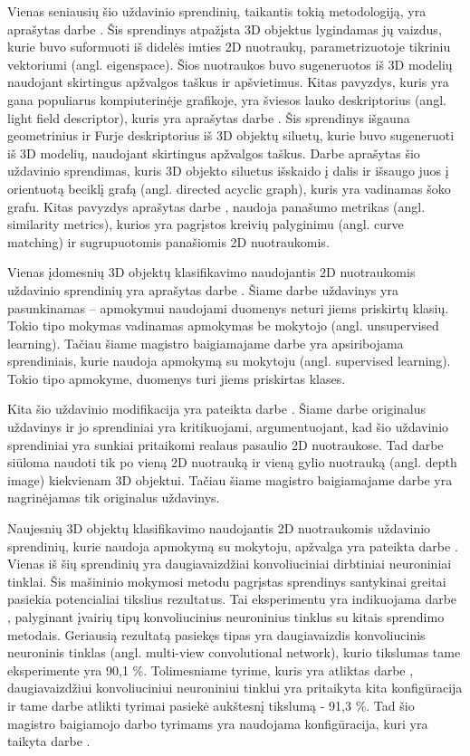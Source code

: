 Vienas seniausių šio uždavinio sprendinių, taikantis tokią metodologiją, yra aprašytas darbe \cite{prevWparEig}. Šis sprendinys atpažįsta 3D objektus lygindamas jų vaizdus, kurie buvo suformuoti iš didelės imties 2D nuotraukų, parametrizuotoje tikriniu vektoriumi (angl. eigenspace). Šios nuotraukos buvo sugeneruotos iš 3D modelių naudojant skirtingus apžvalgos taškus ir apšvietimus. Kitas pavyzdys, kuris yra gana populiarus kompiuterinėje grafikoje, yra šviesos lauko deskriptorius (angl. light field descriptor), kuris yra aprašytas darbe \cite{prevWLightFld}. Šis sprendinys išgauna geometrinius ir Furje deskriptorius iš 3D objektų siluetų, kurie buvo sugeneruoti iš 3D modelių, naudojant skirtingus apžvalgos taškus. Darbe \cite{prevWShockGraph} aprašytas šio uždavinio sprendimas, kuris 3D objekto siluetus išskaido į dalis ir išsaugo juos į orientuotą beciklį grafą (angl. directed acyclic graph), kuris yra vadinamas šoko grafu. Kitas pavyzdys aprašytas darbe \cite{prevWSimMet}, naudoja panašumo metrikas (angl. similarity metrics), kurios yra pagrįstos kreivių palyginimu (angl. curve matching) ir sugrupuotomis panašiomis 2D nuotraukomis.

Vienas įdomesnių 3D objektų klasifikavimo naudojantis 2D nuotraukomis uždavinio sprendinių yra aprašytas darbe \cite{self_supervised}. Šiame darbe uždavinys yra pasunkinamas -- apmokymui naudojami duomenys neturi jiems priskirtų klasių. Tokio tipo mokymas vadinamas apmokymas be mokytojo (angl. unsupervised learning). Tačiau šiame magistro baigiamajame darbe yra apsiribojama sprendiniais, kurie naudoja apmokymą su mokytoju (angl. supervised learning). Tokio tipo apmokyme, duomenys turi jiems priskirtas klases.

Kita šio uždavinio modifikacija yra pateikta darbe \cite{depth_images}. Šiame darbe originalus uždavinys ir jo sprendiniai yra kritikuojami, argumentuojant, kad šio uždavinio sprendiniai yra sunkiai pritaikomi realaus pasaulio 2D nuotraukose. Tad darbe \cite{depth_images} siūloma naudoti tik po vieną 2D nuotrauką ir vieną gylio nuotrauką (angl. depth image) kiekvienam 3D objektui. Tačiau šiame magistro baigiamajame darbe yra nagrinėjamas tik originalus uždavinys.

Naujesnių 3D objektų klasifikavimo naudojantis 2D nuotraukomis uždavinio sprendinių, kurie naudoja apmokymą su mokytoju, apžvalga yra pateikta darbe \cite{survey}. Vienas iš šių sprendinių yra daugiavaizdžiai konvoliuciniai dirbtiniai neuroniniai tinklai. Šis mašininio mokymosi metodu pagrįstas sprendinys santykinai greitai pasiekia potencialiai tikslius rezultatus. Tai eksperimentu yra indikuojama darbe \cite{cnnExp1}, palyginant įvairių tipų konvoliucinius neuroninius tinklus su kitais sprendimo metodais. Geriausią rezultatą pasiekęs tipas yra daugiavaizdis konvoliucinis neuroninis tinklas (angl. multi-view convolutional network), kurio tikslumas tame eksperimente yra 90,1 \%. Tolimesniame tyrime, kuris yra atliktas darbe \cite{cnnExp2}, daugiavaizdžiui konvoliuciniui neuroniniui tinklui yra pritaikyta kita konfigūracija ir tame darbe atlikti tyrimai pasiekė aukštesnį tikslumą - 91,3 \%. Tad šio magistro baigiamojo darbo tyrimams yra naudojama konfigūracija, kuri yra taikyta darbe \cite{cnnExp2}.

